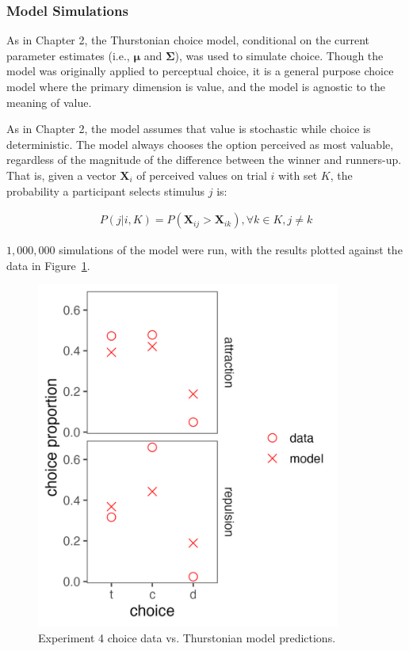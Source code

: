 \subsubsection{Model Simulations}

As in Chapter 2, the Thurstonian choice model, conditional on the current parameter estimates (i.e., $\boldsymbol{\mu}$ and $\boldsymbol{\Sigma}$), was used to simulate choice. Though the model was originally applied to perceptual choice, it is a general purpose choice model where the primary dimension is value, and the model is agnostic to the meaning of value. 

As in Chapter 2, the model assumes that value is stochastic while choice is deterministic. The model always chooses the option perceived as most valuable, regardless of the magnitude of the difference between the winner and runners-up. That is, given a vector $\mathbf{X}_i$ of perceived values on trial $i$ with set $K$, the probability a participant selects stimulus $j$ is:

\begin{align}
   P(j|i,K)=P(\mathbf{X}_{ij}>\mathbf{X}_{ik}), \forall k \in K, j \neq k
   \label{eqn:pchoice_price}
\end{align}

$1,000,000$ simulations of the model were run, with the results plotted against the data in Figure~\ref{fig:bayes_choice_sim_preds}.

\begin{figure}
    \centering
    \includegraphics[scale=.5,width=100mm]{figures/bayes_choice_sim_preds.jpeg}
    \caption{Experiment 4 choice data vs. Thurstonian model predictions.}
    \label{fig:bayes_choice_sim_preds}
\end{figure}

